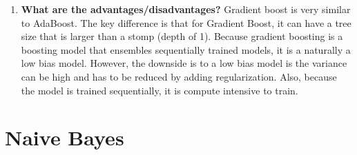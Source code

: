 \documentclass{article}
\begin{document}
\begin{enumerate}
    \item \textbf{What are the advantages/disadvantages?}
    \noindent 
    \smallbreak
    Gradient boost is very similar to AdaBoost. The key difference is that for Gradient Boost, it can have a tree size that is larger than a stomp (depth of 1). Because gradient boosting is a boosting model that ensembles sequentially trained models, it is a naturally a low bias model. However, the downside is to a low bias model is the variance can be high and has to be reduced by adding regularization. Also, because the model is trained sequentially, it is compute intensive to train.
    
\end{enumerate}

\section{Naive Bayes}
\end{document}
